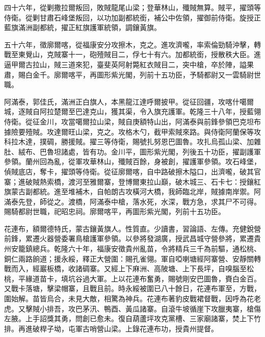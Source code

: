\begin{pinyinscope}
四十六年，從剿撒拉爾叛回，敗賊龍尾山梁；登華林山，殲賊無算。賊平，擢頭等侍衛。從剿甘肅石峰堡叛回，以功加副都統銜，補公中佐領，擢御前侍衛。旋授正藍旗滿洲副都統，擢正紅旗護軍統領，調鑲黃旗。

五十六年，徵廓爾喀，從福康安分攻擦木，克之。進攻濟嚨，率索倫勁騎沖擊，轉戰至東覺山，克賊寨十一，砲殪賊目二，俘七十有六。加都統銜，授散秩大臣。進逼甲爾古拉山，賊三道來犯，臺斐英阿射斃紅衣賊目二，突中槍，卒於陣，謚果肅，賜白金千。廓爾喀平，再圖形紫光閣，列前十五功臣，予騎都尉又一雲騎尉世職。

阿滿泰，郭佳氏，滿洲正白旗人，本黑龍江達呼爾披甲。從征回疆，攻喀什噶爾城，逐賊自阿拉楚爾至巴達克山，獲其渠，令入旗充護軍。乾隆三十八年，授藍翎侍衛。從征金川，攻當噶爾拉山梁，賊自庚額特山出，阿滿泰與前鋒參領巴克坦布據險要殪賊。攻達爾旺山梁，克之。攻格木勺，截甲索賊來路。與侍衛阿蘭保等攻科拉木達，撲碉，勝援賊。擢三等侍衛，賜號扎努恩巴圖魯。攻扎烏孤山梁、加雜肚、絨布、巴魯坦諸處，皆有功。金川平，圖形紫光閣，列後五十功臣，擢副護軍參領。蘭州回為亂，從軍攻華林山，殲賊百餘，身被創，擢護軍參領。攻石峰堡，偵賊底店，奪卡，擢頭等侍衛。從征廓爾喀，自中路破擦木隘口，出濟嚨，破其官寨；進破賊熱索橋，渡河至雅爾寨，登博爾東拉山巔，破木城三、石卡七：授鑲紅旗蒙古副都統。進至堆補木，自帕朗古攻橫河大橋，我師臨北岸，賊據南岸禦。阿滿泰先登，師從之。渡橋，阿滿泰中槍，落水死，水深，戰方急，求其尸不可得。賜騎都尉世職，祀昭忠祠。廓爾喀平，再圖形紫光閣，列前十五功臣。

花連布，額爾德特氏，蒙古鑲黃旗人。性質直。少讀書，習論語、左傳。充健銳營前鋒，累遷火器營委署鳥槍護軍參領。以參將發湖廣，授武昌城守營參將，累遷貴州安籠鎮總兵。乾隆六十年，福康安徵貴州亂苗，令將精兵三千為前驅，通松桃、銅仁兩路餉道；援永綏，釋正大營圍：賜孔雀翎。軍自啞喇塘經阿寨營、安靜關轉戰而入，經巖板橋，收諸碉寨。又經上下麻洲、高陂塘、上下長坪，自嗅腦至松桃，平緣道苗卡，填坑谷過大軍。上以花連布奮勇，賜號剛安巴圖魯，賚白金百。又戰卡落塘，擊梁帽寨，且戰且前。時永綏被圍已八十餘日，花連布軍至，方戰，圍始解。苗皆烏合，未見大敵，相驚為神兵。花連布著豹皮戰裙督戰，因呼為花老虎。又擊賊小排吾，攻巴茅汛、鴨酉、黃瓜諸寨。自滾牛坡循崖下攻臘夷寨，槍傷左腋。上手詔獎其勇，問創已愈未。復自葫蘆坪攻克黨槽、三家廟諸寨，焚上下竹排。再進破桿子坳，屯軍古哨營山梁。上錄花連布功，授貴州提督。


\end{pinyinscope}

